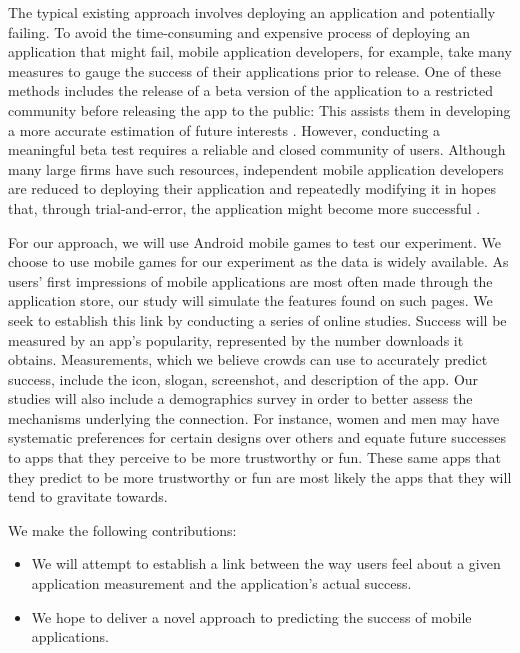 The typical existing approach involves deploying an application and potentially failing. To avoid the time-consuming and expensive process of deploying an application that might fail, mobile application developers, for example, take many measures to gauge the success of their applications prior to release.  One of these methods includes the release of a beta version of the application to a restricted community before releasing the app to the public: This assists them in developing a more accurate estimation of future interests \cite{betatest}. However, conducting a meaningful beta test requires a reliable and closed community of users. Although many large firms have such resources, independent mobile application developers are reduced to deploying their application and repeatedly modifying it in hopes that, through trial-and-error, the application might become more successful \cite{betatest}.

For our approach, we will use Android mobile games to test our experiment. We choose to use mobile games for our experiment as the data is widely available. As users' first impressions of mobile applications are most often made through the application store, our study will simulate the features found on such pages. We seek to establish this link by conducting a series of online studies. Success will be measured by an app's popularity, represented by the number downloads it obtains. Measurements, which we believe crowds can use to accurately predict success, include the icon, slogan, screenshot, and description of the app. Our studies will also include a demographics survey in order to better assess the mechanisms underlying the connection. For instance, women and men may have systematic preferences for certain designs over others and equate future successes to apps that they perceive to be more trustworthy or fun.  These same apps that they predict to be more trustworthy or fun are most likely the apps that they will tend to gravitate towards.

We make the following contributions:
\begin{itemize}
\item We will attempt to establish a link between the way users feel about a given application measurement and the application's actual success.
\item We hope to deliver a novel approach to predicting the success of mobile applications.
\end{itemize}

